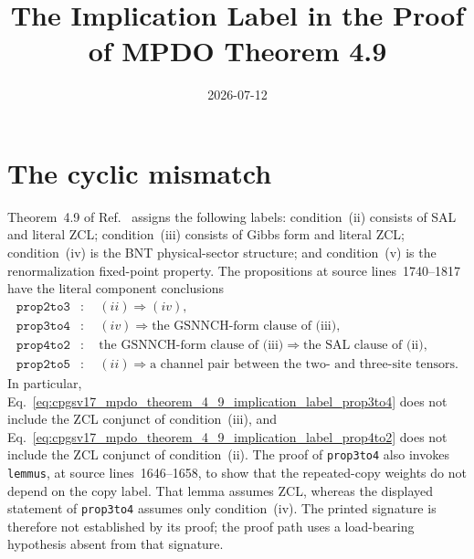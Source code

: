 \documentclass{article}
\title{The Implication Label in the Proof of MPDO Theorem 4.9}
\author{}
\date{2026-07-12}
\begin{document}
\maketitle
{}

\section{The cyclic mismatch}

Theorem~4.9 of Ref.~\cite[lines~851--893]{Cirac2016MPDO_arXiv} assigns the
following labels: condition~(ii) consists of SAL and literal ZCL;
condition~(iii) consists of Gibbs form and literal ZCL; condition~(iv) is the
BNT physical-sector structure; and condition~(v) is the renormalization
fixed-point property. The propositions at source lines~1740--1817 have the
literal component conclusions
\begin{align}
    \mathtt{prop2to3}
        &:\quad (ii)\Longrightarrow(iv),
    \label{eq:cpgsv17_mpdo_theorem_4_9_implication_label_prop2to3}\\
    \mathtt{prop3to4}
        &:\quad (iv)\Longrightarrow
        \text{the GSNNCH-form clause of (iii)},
    \label{eq:cpgsv17_mpdo_theorem_4_9_implication_label_prop3to4}\\
    \mathtt{prop4to2}
        &:\quad \text{the GSNNCH-form clause of (iii)}
        \Longrightarrow\text{the SAL clause of (ii)},
    \label{eq:cpgsv17_mpdo_theorem_4_9_implication_label_prop4to2}\\
    \mathtt{prop2to5}
        &:\quad (ii)\Longrightarrow
        \text{a channel pair between the two- and three-site tensors}.
    \label{eq:cpgsv17_mpdo_theorem_4_9_implication_label_prop2to5}
\end{align}
In particular,
Eq.~\ref{eq:cpgsv17_mpdo_theorem_4_9_implication_label_prop3to4} does not
include the ZCL conjunct of condition~(iii), and
Eq.~\ref{eq:cpgsv17_mpdo_theorem_4_9_implication_label_prop4to2} does not
include the ZCL conjunct of condition~(ii). The proof of
\texttt{prop3to4} also invokes \texttt{lemmus}, at source
lines~1646--1658, to show that the repeated-copy weights do not depend on the
copy label. That lemma assumes ZCL, whereas the displayed statement of
\texttt{prop3to4} assumes only condition~(iv). The printed signature is
therefore not established by its proof; the proof path uses a load-bearing
hypothesis absent from that signature.
\end{document}
